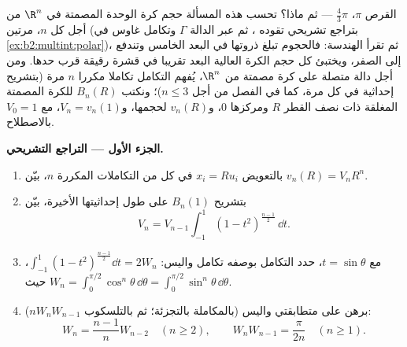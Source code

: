 \begin{problem}[{مسألة نهاية الأسبوع --- $V_n =
\pi^{n/2}/\Gamma(\frac n2 + 1)$، وغرابة الأبعاد
العليا}]\label{pb:b2:multint:1}
 القرص $\pi$،  $\frac43\pi$ --- ثم ماذا؟ تحسب
هذه المسألة حجم كرة الوحدة المصمتة في $\R^n$ من أجل كل $n$،
مرتين (بتراجع تشريحي تقوده ، ثم عبر الدالة $\Gamma$
وتكامل غاوس في \cref{ex:b2:multint:polar})، ثم تقرأ الهندسة: فالحجوم تبلغ ذروتها في
البعد الخامس وتندفع إلى الصفر، ويختبئ كل حجم الكرة العالية البعد
تقريبا في قشرة رقيقة قرب حدها.
ومن أجل دالة متصلة على كرة مصمتة من $\R^n$، يُفهم التكامل تكاملا
مكررا $n$ مرة (بتشريح إحداثية في كل مرة، كما في الفصل من أجل
$n
\leq 3$)؛ ونكتب $B_n(R)$ للكرة المصمتة المغلقة ذات نصف القطر $R$
ومركزها $0$، و$v_n(R)$ لحجمها، و$V_n =
v_n(1)$، مع $V_0 = 1$ بالاصطلاح.

\medskip
\noindent\textbf{الجزء الأول --- التراجع التشريحي.}
\begin{enumerate}
  \item بالتعويض $x_i = Ru_i$ في كل من التكاملات المكررة $n$، بيّن
        $v_n(R) = V_nR^n$.
  \item بتشريح $B_n(1)$ على طول إحداثيتها الأخيرة، بيّن
        \[
        V_n = V_{n-1}\int_{-1}^{1}(1 -
        t^2)^{\frac{n-1}2}\,\dd t .
        \]
  \item مع $t = \sin\theta$، حدد التكامل بوصفه تكامل واليس: $\int_{-1}^1(1 -
        t^2)^{\frac{n-1}2}\dd t = 2W_n$، حيث
        $W_n =
        \int_0^{\pi/2}\cos^n\theta\,\dd\theta =
        \int_0^{\pi/2}\sin^n\theta\,\dd\theta$.
  \item برهن على متطابقتي واليس (بالمكاملة بالتجزئة؛ ثم بالتلسكوب
        $nW_nW_{n-1}$):
        \[
        W_n = \frac{n-1}nW_{n-2} \quad (n \geq 2),
        \qquad
        W_nW_{n-1} = \frac{\pi}{2n} \quad (n \geq 1).
        \]
\end{enumerate}


\end{problem}
